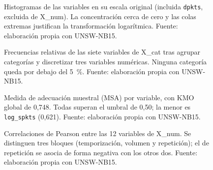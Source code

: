 \begin{figure}[htbp]
  \centering
  \caption[Histogramas en escala original]{Histogramas de las variables en su escala original (incluida \texttt{dpkts}, excluida de X\_num). La concentración cerca de cero y las colas extremas justifican la transformación logarítmica. Fuente: elaboración propia con UNSW-NB15.}
  \label{fig:a-hist-crudos}
\end{figure}

\begin{figure}[htbp]
  \centering
  \caption[Frecuencias de las variables de X\_cat]{Frecuencias relativas de las siete variables de X\_cat tras agrupar categorías y discretizar tres variables numéricas. Ninguna categoría queda por debajo del 5~\%. Fuente: elaboración propia con UNSW-NB15.}
  \label{fig:a-frecuencias}
\end{figure}

\begin{figure}[htbp]
  \centering
  \caption[MSA por variable y KMO global]{Medida de adecuación muestral (MSA) por variable, con KMO global de 0,748. Todas superan el umbral de 0,50; la menor es \texttt{log\_spkts} (0,621). Fuente: elaboración propia con UNSW-NB15.}
  \label{fig:a-msa}
\end{figure}

\begin{figure}[htbp]
  \centering
  \caption[Correlaciones entre las 12 variables de X\_num]{Correlaciones de Pearson entre las 12 variables de X\_num. Se distinguen tres bloques (temporización, volumen y repetición); el de repetición se asocia de forma negativa con los otros dos. Fuente: elaboración propia con UNSW-NB15.}
  \label{fig:correlaciones}
\end{figure}

